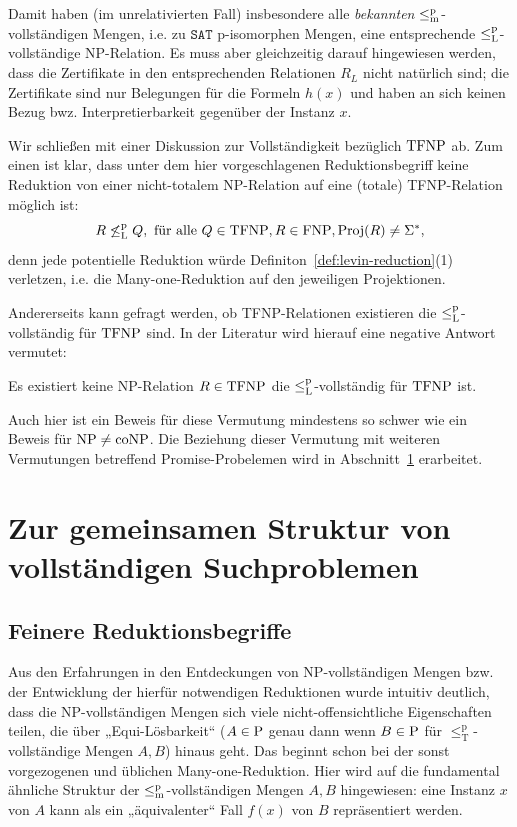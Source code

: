 Damit haben (im unrelativierten Fall) insbesondere alle \emph{bekannten} $\leqmp$-vollständigen Mengen, i.e. zu $\mathtt{SAT}$ p-isomorphen Mengen, eine entsprechende $\leqlp$-vollständige NP-Relation.
Es muss aber gleichzeitig darauf hingewiesen werden, dass die Zertifikate in den entsprechenden Relationen $R_L$ nicht natürlich sind; die Zertifikate sind nur Belegungen für die Formeln $h(x)$ und haben an sich keinen Bezug bwz. Interpretierbarkeit gegenüber der Instanz $x$.

Wir schließen mit einer Diskussion zur Vollständigkeit bezüglich $\TFNP$ ab. Zum einen ist klar, dass unter dem hier vorgeschlagenen Reduktionsbegriff keine Reduktion von einer nicht-totalem NP-Relation auf eine (totale) TFNP-Relation möglich ist: 
\[ R \not\leqlp Q, \text{ für alle } Q\in\TFNP, R\in\FNP, \Proj(R)\neq\Sigma^*, \]
denn jede potentielle Reduktion würde Definiton~\ref{def:levin-reduction}(1) verletzen, i.e. die Many-one-Reduktion auf den jeweiligen Projektionen.

Andererseits kann gefragt werden, ob TFNP-Relationen existieren die $\leqlp$-vollständig für $\TFNP$ sind. In der Literatur \parencite[vgl.][]{pudlak_incompleteness_2017} wird hierauf eine negative Antwort vermutet:
\begin{conjecture}[\hTFNP]
    Es existiert keine NP-Relation $R\in\TFNP$ die $\leqlp$-vollständig für $\TFNP$ ist.
\end{conjecture}
Auch hier ist ein Beweis für diese Vermutung mindestens so schwer wie ein Beweis für $\NP\neq\coNP$. Die Beziehung dieser Vermutung mit weiteren Vermutungen betreffend Promise-Probelemen wird in Abschnitt~\ref{} erarbeitet.

\section{Zur gemeinsamen Struktur von vollständigen Suchproblemen}

\subsection*{Feinere Reduktionsbegriffe}

Aus den Erfahrungen in den Entdeckungen von NP-vollständigen Mengen bzw. der Entwicklung der hierfür notwendigen Reduktionen wurde intuitiv deutlich, dass die NP-vollständigen Mengen sich viele nicht-offensichtliche Eigenschaften teilen, die über „Equi-Lösbarkeit“ ($A\in \P$ genau dann wenn $B\in \P$ für $\leq_\mathrm T^\mathrm p$-vollständige Mengen $A,B$) hinaus geht.
%
Das beginnt schon bei der sonst vorgezogenen und üblichen Many-one-Reduktion. Hier wird auf die fundamental ähnliche Struktur der $\leqmp$-vollständigen Mengen $A, B$ hingewiesen: eine Instanz $x$ von $A$ kann als ein „äquivalenter“ Fall $f(x)$ von $B$ repräsentiert werden.

